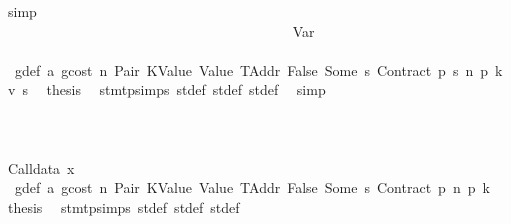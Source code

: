 \begin{isabellebody}
\ simp\isanewline
\ \ \ \ \ \ \ \ \ \ \ \ \ \ \ \ \ \ \ \ \ \ \ \ \ \ \ \ \ \ \ \ \ \ \ \ \ \ \isamarkupfalse%
\isanewline
\ \ \ \ \ \ \ \ \ \ \ \ \ \ \ \ \ \ \ \ \ \ \ \ \ \ \ \ \ \ \ \ \ \ \ \ \ \ \ \ \isamarkupfalse%
\ {\isacharparenleft}{\kern0pt}Var\ {\isacharunderscore}{\kern0pt}{\isacharparenright}{\kern0pt}\isanewline
\ \ \ \ \ \ \ \ \ \ \ \ \ \ \ \ \ \ \ \ \ \ \ \ \ \ \ \ \ \ \ \ \ \ \ \ \ \ \ \ \isamarkupfalse%
\ {}{\isacharparenleft}{\kern0pt}{}{\isacharparenright}{\kern0pt}\ g{\isacharunderscore}{\kern0pt}def\ a{}\ gcost\ n\ Pair\ KValue\ Value\ TAddr\ False\ Some\ s{}\ Contract\ p{}\ s{}\ n{}\ p{}\ k{}\ v\ s{}\ \isamarkupfalse%
\ {\isacharquery}{\kern0pt}thesis\ \isamarkupfalse%
\ stmt{\isachardot}{\kern0pt}psimps{\isacharparenleft}{\kern0pt}{}{\isacharparenright}{\kern0pt}\ st{\isacharprime}{\kern0pt}{\isacharunderscore}{\kern0pt}def\ st{\isacharprime}{\kern0pt}{\isacharprime}{\kern0pt}{\isacharunderscore}{\kern0pt}def\ st{\isacharprime}{\kern0pt}{\isacharprime}{\kern0pt}{\isacharprime}{\kern0pt}{\isacharunderscore}{\kern0pt}def\ \isamarkupfalse%
\ simp\isanewline
\ \ \ \ \ \ \ \ \ \ \ \ \ \ \ \ \ \ \ \ \ \ \ \ \ \ \ \ \ \ \ \ \ \ \ \ \ \ \isamarkupfalse%
\isanewline
\ \ \ \ \ \ \ \ \ \ \ \ \ \ \ \ \ \ \ \ \ \ \ \ \ \ \ \ \ \ \ \ \ \ \ \ \isamarkupfalse%
\isanewline
\ \ \ \ \ \ \ \ \ \ \ \ \ \ \ \ \ \ \ \ \ \ \ \ \ \ \ \ \ \ \ \ \ \ \isamarkupfalse%
\isanewline
\ \ \ \ \ \ \ \ \ \ \ \ \ \ \ \ \ \ \ \ \ \ \ \ \ \ \ \ \ \ \ \ \isamarkupfalse%
\isanewline
\ \ \ \ \ \ \ \ \ \ \ \ \ \ \ \ \ \ \ \ \ \ \ \ \ \ \ \ \ \ \ \ \ \ \isamarkupfalse%
\ {\isacharparenleft}{\kern0pt}Calldata\ x{}{\isacharparenright}{\kern0pt}\isanewline
\ \ \ \ \ \ \ \ \ \ \ \ \ \ \ \ \ \ \ \ \ \ \ \ \ \ \ \ \ \ \ \ \ \ \isamarkupfalse%
\ {}{\isacharparenleft}{\kern0pt}{}{\isacharparenright}{\kern0pt}\ g{\isacharunderscore}{\kern0pt}def\ a{}\ gcost\ n\ Pair\ KValue\ Value\ TAddr\ False\ Some\ s{}\ Contract\ p{}\ n{}\ p{}\ k{}\ \isamarkupfalse%
\ {\isacharquery}{\kern0pt}thesis\ \isamarkupfalse%
\ stmt{\isachardot}{\kern0pt}psimps{\isacharparenleft}{\kern0pt}{}{\isacharparenright}{\kern0pt}\ st{\isacharprime}{\kern0pt}{\isacharunderscore}{\kern0pt}def\ st{\isacharprime}{\kern0pt}{\isacharprime}{\kern0pt}{\isacharunderscore}{\kern0pt}def\ st{\isacharprime}{\kern0pt}{\isacharprime}{\kern0pt}{\isacharprime}{\kern0pt}{\isacharunderscore}{\kern0pt}def\ \isamarkupfalse%

\end{isabellebody}
